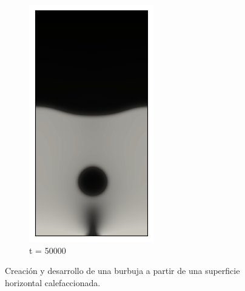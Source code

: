 \begin{figure}[h!]
\begin{subfigure}{0.25\textwidth}
		\includegraphics[width=\linewidth]{figs/cap4/bubble_50}
		\caption{t = 50000}
		\label{fig:9}
	\end{subfigure}
	\caption{Creación y desarrollo de una burbuja a partir de una superficie horizontal calefaccionada.}
	\label{fig:secuencia_burbujas}
\end{figure}

